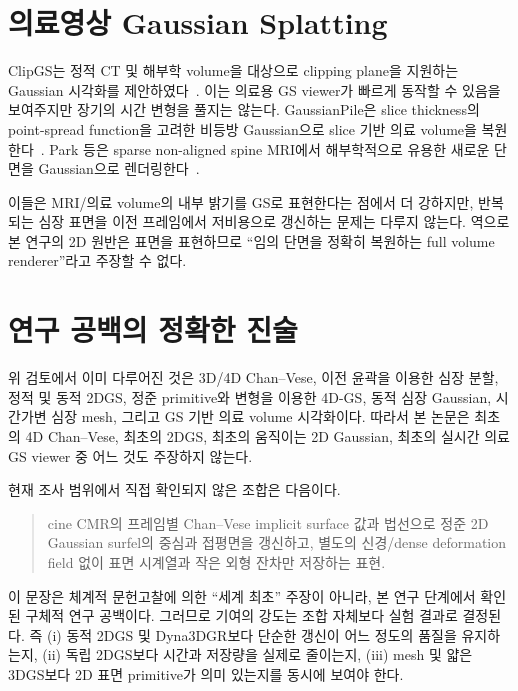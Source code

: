 \section{의료영상 Gaussian Splatting}

ClipGS는 정적 CT 및 해부학 volume을 대상으로 clipping plane을 지원하는 Gaussian
시각화를 제안하였다~\citep{li2025_clipgs}. 이는 의료용 GS viewer가 빠르게 동작할 수
있음을 보여주지만 장기의 시간 변형을 풀지는 않는다. GaussianPile은 slice thickness의
point-spread function을 고려한 비등방 Gaussian으로 slice 기반 의료 volume을
복원한다~\citep{kong2026_gaussianpile}. Park 등은 sparse non-aligned spine MRI에서
해부학적으로 유용한 새로운 단면을 Gaussian으로 렌더링한다~\citep{park2026_rendering}.

이들은 MRI/의료 volume의 내부 밝기를 GS로 표현한다는 점에서 더 강하지만, 반복되는
심장 표면을 이전 프레임에서 저비용으로 갱신하는 문제는 다루지 않는다. 역으로 본
연구의 2D 원반은 표면을 표현하므로 ``임의 단면을 정확히 복원하는 full volume
renderer''라고 주장할 수 없다.

\section{연구 공백의 정확한 진술}
\label{sec:gap}

위 검토에서 이미 다루어진 것은 3D/4D Chan--Vese, 이전 윤곽을 이용한 심장 분할,
정적 및 동적 2DGS, 정준 primitive와 변형을 이용한 4D-GS, 동적 심장 Gaussian,
시간가변 심장 mesh, 그리고 GS 기반 의료 volume 시각화이다. 따라서 본 논문은 최초의
4D Chan--Vese, 최초의 2DGS, 최초의 움직이는 2D Gaussian, 최초의 실시간 의료 GS
viewer 중 어느 것도 주장하지 않는다.

현재 조사 범위에서 직접 확인되지 않은 조합은 다음이다.

\begin{quote}
cine CMR의 프레임별 Chan--Vese implicit surface 값과 법선으로 정준 2D Gaussian
surfel의 중심과 접평면을 갱신하고, 별도의 신경/dense deformation field 없이
표면 시계열과 작은 외형 잔차만 저장하는 표현.
\end{quote}

이 문장은 체계적 문헌고찰에 의한 ``세계 최초'' 주장이 아니라, 본 연구 단계에서
확인된 구체적 연구 공백이다. 그러므로 기여의 강도는 조합 자체보다 실험 결과로
결정된다. 즉 (i) 동적 2DGS 및 Dyna3DGR보다 단순한 갱신이 어느 정도의 품질을
유지하는지, (ii) 독립 2DGS보다 시간과 저장량을 실제로 줄이는지, (iii) mesh 및 얇은
3DGS보다 2D 표면 primitive가 의미 있는지를 동시에 보여야 한다.
